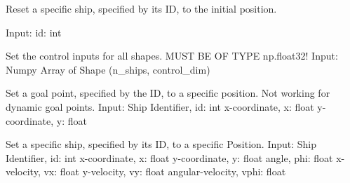 \documentclass[letterpaper,10pt,english]{sphinxmanual}
\begin{document}
\begin{fulllineitems}
\begin{fulllineitems}
\end{fulllineitems}


\begin{fulllineitems}
\label{\detokenize{pomdp_spaceship_env:pomdp_spaceship_env.Env.ResetToInit}}
Reset a specific ship, specified by its ID, to the initial position.

Input:
id: int

\end{fulllineitems}


\begin{fulllineitems}
\label{\detokenize{pomdp_spaceship_env:pomdp_spaceship_env.Env.SetControl}}
Set the control inputs for all shapes. MUST BE OF TYPE np.float32!
Input:
Numpy Array of Shape (n\_ships, control\_dim)

\end{fulllineitems}


\begin{fulllineitems}
\label{\detokenize{pomdp_spaceship_env:pomdp_spaceship_env.Env.SetGoal}}
Set a goal point, specified by the ID, to a specific position. Not working for dynamic goal points.
Input:
Ship Identifier, id: int
x-coordinate, x: float
y-coordinate, y: float

\end{fulllineitems}


\begin{fulllineitems}
\label{\detokenize{pomdp_spaceship_env:pomdp_spaceship_env.Env.SetShip}}
Set a specific ship, specified by its ID, to a specific Position.
Input:
Ship Identifier, id: int
x-coordinate, x: float
y-coordinate, y: float
angle, phi: float
x-velocity, vx: float
y-velocity, vy: float
angular-velocity, vphi: float


\end{fulllineitems}
\end{fulllineitems}
\end{document}
